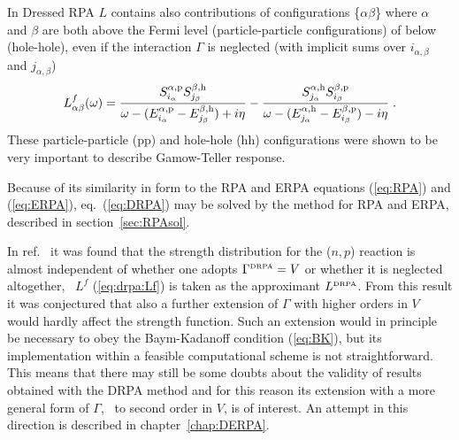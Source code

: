 %
In Dressed RPA $L$ contains also contributions of configurations
\{$\alpha\beta$\} where $\alpha$ and $\beta$ are both above the Fermi level 
(particle-particle configurations) of below (hole-hole),
even if the interaction
$\Gamma$ is neglected (with implicit sums over $i_{\alpha,\beta}$ and
$j_{\alpha,\beta}$)
%
	\begin{equation}
		L_{\alpha\beta}^f(\omega)
	=
		\frac{S^{\alpha,{\rm p}}_{i_{\alpha}}S^{\beta,{\rm h}}_{j_{\beta}}}
		{\omega-(E^{\alpha,{\rm p}}_{i_{\alpha}}-E^{\beta,{\rm h}}_{j_{\beta}})+i\eta}
	-
		\frac{S^{\alpha,{\rm h}}_{j_{\alpha}}S^{\beta,{\rm p}}_{i_{\beta}}}
		{\omega-(E^{\alpha,{\rm h}}_{j_{\alpha}}-E^{\beta,{\rm p}}_{i_{\beta}})-i\eta}
	\;.
	\label{eq:drpa:Lf}
	\end{equation}
%
These particle-particle (pp) and hole-hole (hh) configurations
were shown to be very important to describe Gamow-Teller response\cite{RGBA93}.

Because of its similarity in form to the RPA and ERPA equations (\ref{eq:RPA})
and (\ref{eq:ERPA}), eq.~(\ref{eq:DRPA}) may be solved by the method for
RPA and ERPA, described in section~\ref{sec:RPAsol}.

In ref.~\cite{RGBA93} it was found that the strength distribution for the 
($n,p$) reaction is almost independent of whether one adopts  
$\Gamma^{\mbox{\tiny DRPA}}=V$ 
or 
whether it is neglected altogether, \ie\ $L^f$ (\ref{eq:drpa:Lf})
is taken as the approximant $L^{\mbox{\tiny DRPA}}$.
{}From this result it was conjectured
that also a further extension of $\Gamma$ with higher orders in $V$ would 
hardly affect the strength function. Such an extension would in principle be 
necessary to obey the Baym-Kadanoff condition (\ref{eq:BK}), but its 
implementation within a feasible computational scheme is not straightforward.
This means that there may still be some doubts about the validity of results 
obtained with the DRPA method and for this reason its extension with a more 
general form of $\Gamma$, \eg\ to second order in $V$, is of interest. 
An attempt in this direction is described in chapter~\ref{chap:DERPA}.
